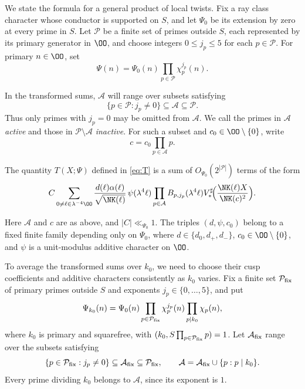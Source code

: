 We state the formula for a general product of local twists.
Fix a ray class character whose conductor is supported on $S$,
and let $\Psi_0$ be its extension by zero at every prime in $S$.
Let $\mathcal P$ be a finite set of primes outside $S$,
each represented by its primary generator in $\OO$,
and choose integers $0\le j_p\le5$ for each $p\in\mathcal P$.
For primary $n\in\OO$, set
\[
 \Psi(n)=\Psi_0(n)\prod_{p\in\mathcal P}\chi_p^{j_p}(n).
\]


In the transformed sums, $\mathcal A$ will range over subsets satisfying
\[
 \{p\in\mathcal P:j_p\ne0\}\subseteq\mathcal A\subseteq\mathcal P.
\]
Thus only primes with $j_p=0$ may be omitted from $\mathcal A$.
We call the primes in $\mathcal A$ \emph{active} and those in $\mathcal P\setminus\mathcal A$ \emph{inactive}.
For such a subset and $c_0\in\OO\setminus\{0\}$, write
\[
 c=c_0\prod_{p\in\mathcal A}p.
\]


\begin{proposition}\label{lem:reflection}
The quantity $T(X;\Psi)$ defined in \eqref{eq:T} is a sum of $O_{\Psi_0}(2^{|\mathcal P|})$ terms of the form
\begin{equation}\label{eq:reflection}
 C\sum_{0\ne\ell\in\lambda^{-4}\OO}
 \frac{d(\ell)\alpha(\ell)}{\sqrt{\NK(\ell)}}\,
 \psi(\lambda^4\ell)
 \prod_{p\in\mathcal A}B_{p,j_p}(\lambda^4\ell)
 V_*^\sharp\!\Bigl(\frac{\NK(\ell) X}{\NK(c)^2}\Bigr).
\end{equation}


Here $\mathcal A$ and $c$ are as above, and $|C|\ll_{\Psi_0}1$.
The triples $(d,\psi,c_0)$ belong to a fixed finite family depending
only on $\Psi_0$, where $d\in\{d_0,d_+,d_-\}$,
$c_0\in\OO\setminus\{0\}$, and $\psi$ is a unit-modulus additive
character on $\OO$.
\end{proposition}




To average the transformed sums over $k_0$, we need to choose their
cusp coefficients and additive characters consistently as $k_0$ varies.
Fix a finite set $\mathcal P_{\rm fix}$ of primary primes outside $S$
and exponents $j_p\in\{0,\ldots,5\}$, and put
\[
 \Psi_{k_0}(n)=\Psi_0(n)
       \prod_{p\in\mathcal P_{\rm fix}}\chi_p^{j_p}(n)
       \prod_{p\mid k_0}\chi_p(n),
\]
where $k_0$ is primary and squarefree, with
$(k_0,S\prod_{p\in\mathcal P_{\rm fix}}p)=1$.
Let $\mathcal A_{\rm fix}$ range over the subsets satisfying
\[
 \{p\in\mathcal P_{\rm fix}:j_p\ne0\}
       \subseteq\mathcal A_{\rm fix}\subseteq\mathcal P_{\rm fix},
 \qquad
 \mathcal A=\mathcal A_{\rm fix}\cup\{p:p\mid k_0\}.
\]
Every prime dividing $k_0$ belongs to $\mathcal A$, since its exponent is $1$.



